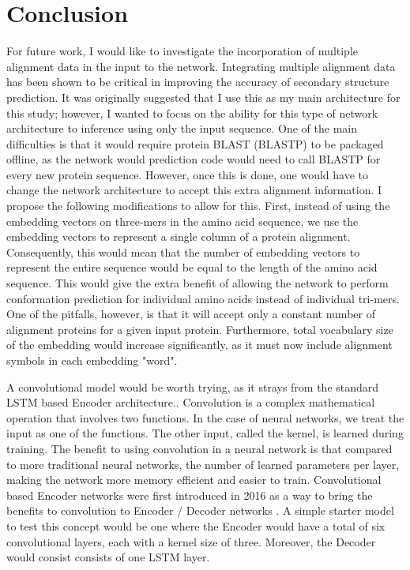 \documentclass[pageno]{jpaper}
\begin{document}
\section{Conclusion}

\par
For future work, I would like to investigate the incorporation of multiple alignment data in the input to the network.  Integrating multiple alignment data has been shown to be critical in improving the accuracy of secondary structure prediction.  It was originally suggested that I use this as my main architecture for this study; however, I wanted to focus on the ability for this type of network architecture to inference using only the input sequence.  One of the main difficulties is that it would require protein BLAST (BLASTP) to be packaged offline, as the network would prediction code would need to call BLASTP for every new protein sequence.  However, once this is done, one would have to change the network architecture to accept this extra alignment information.  I propose the following modifications to allow for this.  First, instead of using the embedding vectors on three-mers in the amino acid sequence, we use the embedding vectors to represent a single column of a protein alignment.  Consequently, this would mean that the number of embedding vectors to represent the entire sequence would be equal to the length of the amino acid sequence.  This would give the extra benefit of allowing the network to perform conformation prediction for individual amino acids instead of individual tri-mers.  One of the pitfalls, however, is that it will accept only a constant number of alignment proteins for a given input protein.  Furthermore, total vocabulary size of the embedding would increase significantly, as it must now include alignment symbols in each embedding "word".

\par
A convolutional model would be worth trying, as it strays from the standard LSTM based Encoder architecture..  Convolution is a complex mathematical operation that involves two functions.  In the case of neural networks, we treat the input as one of the functions.  The other input, called the kernel, is learned during training.  The benefit to using convolution in a neural network is that compared to more traditional neural networks, the number of learned parameters per layer, making the network more memory efficient and easier to train.  Convolutional based Encoder networks were first introduced in 2016 as a way to bring the benefits to convolution to Encoder / Decoder networks \cite{gehring:2016}.  A simple starter model to test this concept would be one where the Encoder would have a total of six convolutional layers, each with a kernel size of three.  Moreover, the Decoder would consist consists of one LSTM layer.
\end{document}
